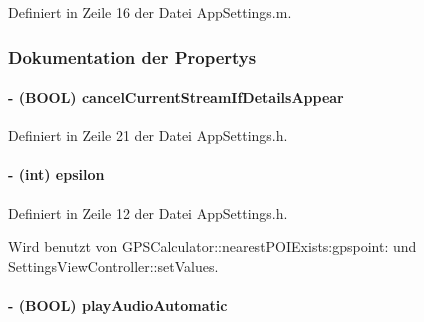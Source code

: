 Definiert in Zeile 16 der Datei AppSettings.m.

\subsubsection{Dokumentation der Propertys}
\hypertarget{interface_app_settings_adad66f85ce01f0256a12afa6e44a0529}{
\paragraph[{cancelCurrentStreamIfDetailsAppear}]{\setlength{\rightskip}{0pt plus 5cm}-\/ (BOOL) cancelCurrentStreamIfDetailsAppear}\hfill}
\label{interface_app_settings_adad66f85ce01f0256a12afa6e44a0529}


Definiert in Zeile 21 der Datei AppSettings.h.\hypertarget{interface_app_settings_a6519c7f0aa9a539c7bddc016b4b7b019}{
\paragraph[{epsilon}]{\setlength{\rightskip}{0pt plus 5cm}-\/ (int) epsilon}\hfill}
\label{interface_app_settings_a6519c7f0aa9a539c7bddc016b4b7b019}


Definiert in Zeile 12 der Datei AppSettings.h.

Wird benutzt von GPSCalculator::nearestPOIExists:gpspoint: und SettingsViewController::setValues.\hypertarget{interface_app_settings_afea0cc95e3f830ecdac947db7dad2cb6}{
\paragraph[{playAudioAutomatic}]{\setlength{\rightskip}{0pt plus 5cm}-\/ (BOOL) playAudioAutomatic}\hfill}
\label{interface_app_settings_afea0cc95e3f830ecdac947db7dad2cb6}


